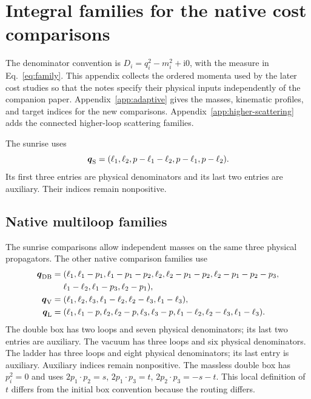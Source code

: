 \section{Integral families for the native cost comparisons}
\label{app:families}
The denominator convention is $D_i=q_i^2-m_i^2+\mathrm{i}0$, with the measure in Eq.~\eqref{eq:family}. This appendix collects the ordered momenta used by the later cost studies so that the notes specify their physical inputs independently of the companion paper. Appendix~\ref{app:adaptive} gives the masses, kinematic profiles, and target indices for the new comparisons. Appendix~\ref{app:higher-scattering} adds the connected higher-loop scattering families.

The sunrise uses
\begin{equation}
\boldsymbol q_{\rm S}=(\ell_1,\ell_2,p-\ell_1-\ell_2,p-\ell_1,p-\ell_2).
\end{equation}
Its first three entries are physical denominators and its last two entries are auxiliary. Their indices remain nonpositive.

\subsection{Native multiloop families}

The sunrise comparisons allow independent masses on the same three physical propagators. The other native comparison families use
\begin{align}
 \boldsymbol q_{\rm DB}={}&(\ell_1,\ell_1-p_1,\ell_1-p_1-p_2,
 \ell_2,\ell_2-p_1-p_2,\ell_2-p_1-p_2-p_3,\nonumber\\
 &\ell_1-\ell_2,\ell_1-p_3,\ell_2-p_1),\\
 \boldsymbol q_{\rm V}={}&(\ell_1,\ell_2,\ell_3,\ell_1-\ell_2,
 \ell_2-\ell_3,\ell_1-\ell_3),\\
 \boldsymbol q_{\rm L}={}&(\ell_1,\ell_1-p,\ell_2,\ell_2-p,\ell_3,
 \ell_3-p,\ell_1-\ell_2,\ell_2-\ell_3,\ell_1-\ell_3).
\end{align}
The double box has two loops and seven physical denominators; its last two entries are auxiliary. The vacuum has three loops and six physical denominators. The ladder has three loops and eight physical denominators; its last entry is auxiliary. Auxiliary indices remain nonpositive. The massless double box has $p_i^2=0$ and uses $2p_1\cdot p_2=s$, $2p_1\cdot p_3=t$, $2p_2\cdot p_3=-s-t$. This local definition of $t$ differs from the initial box convention because the routing differs.


